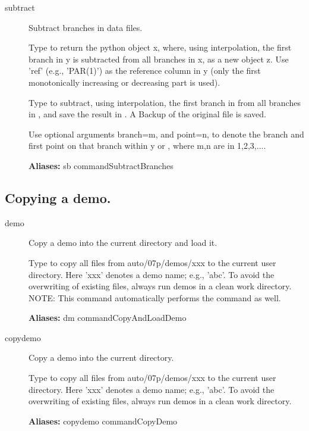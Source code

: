 \documentclass[12pt]{report}
\begin{document}
\begin{description}
\item[subtract]
Subtract branches in data files.

    Type  to return the python object x, where,
    using interpolation, the first branch in y is subtracted from all
    branches in x, as a new object z.
    Use 'ref' (e.g., 'PAR(1)')  as the reference column in y
    (only the first monotonically increasing or decreasing part is used).

    Type  to subtract, using interpolation, the first
    branch in  from all branches in ,
    and save the result in .
    A Backup of the original file is saved.

    Use optional arguments branch=m, and point=n, to denote the branch and
    first point on that branch within y or , where m,n are in
    {1,2,3,...}.

\textbf{Aliases:} sb commandSubtractBranches

\end{description}

\subsection{Copying a demo.}
\label{sec:clui_ref_demo}
\begin{description}
\item[demo]
Copy a demo into the current directory and load it.

    Type  to copy all files from auto/07p/demos/xxx to the
    current user directory.  Here 'xxx' denotes a demo name; e.g.,
    'abc'.  To avoid the overwriting of existing files, always run
    demos in a clean work directory.  NOTE: This command automatically
    performs the  command as well.
    
\textbf{Aliases:} dm commandCopyAndLoadDemo

\item[copydemo]
Copy a demo into the current directory.

    Type  to copy all files from auto/07p/demos/xxx to the
    current user directory.  Here 'xxx' denotes a demo name; e.g.,
    'abc'.  To avoid the overwriting of existing
    files, always run demos in a clean work directory.
    
\textbf{Aliases:} copydemo commandCopyDemo
\end{description}
\end{document}
